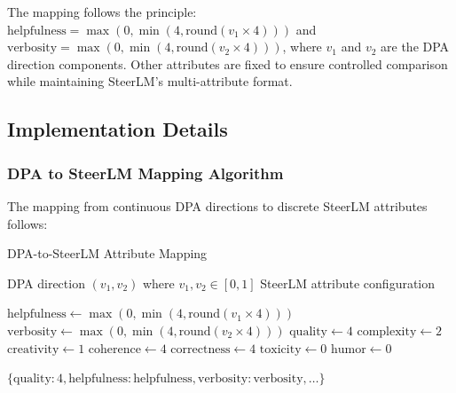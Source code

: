 \documentclass{article} %
\begin{document}
The mapping follows the principle: $\text{helpfulness} = \max(0, \min(4, \text{round}(v_1 \times 4)))$ and $\text{verbosity} = \max(0, \min(4, \text{round}(v_2 \times 4)))$, where $v_1$ and $v_2$ are the DPA direction components. Other attributes are fixed to ensure controlled comparison while maintaining SteerLM's multi-attribute format.

\subsection{Implementation Details}

\subsubsection{DPA to SteerLM Mapping Algorithm}

The mapping from continuous DPA directions to discrete SteerLM attributes follows:

\begin{algorithm}[H]
\caption{DPA-to-SteerLM Attribute Mapping}
\begin{algorithmic}[1]
\REQUIRE DPA direction $(v_1, v_2)$ where $v_1, v_2 \in [0,1]$
\ENSURE SteerLM attribute configuration

\STATE $\text{helpfulness} \leftarrow \max(0, \min(4, \text{round}(v_1 \times 4)))$
\STATE $\text{verbosity} \leftarrow \max(0, \min(4, \text{round}(v_2 \times 4)))$
\STATE $\text{quality} \leftarrow 4$ 
\STATE $\text{complexity} \leftarrow 2$ 
\STATE $\text{creativity} \leftarrow 1$ 
\STATE $\text{coherence} \leftarrow 4$ 
\STATE $\text{correctness} \leftarrow 4$ 
\STATE $\text{toxicity} \leftarrow 0$ 
\STATE $\text{humor} \leftarrow 0$ 

\RETURN $\{\text{quality}: 4, \text{helpfulness}: \text{helpfulness}, \text{verbosity}: \text{verbosity}, \ldots\}$
\end{algorithmic}
\end{algorithm}
\end{document}
